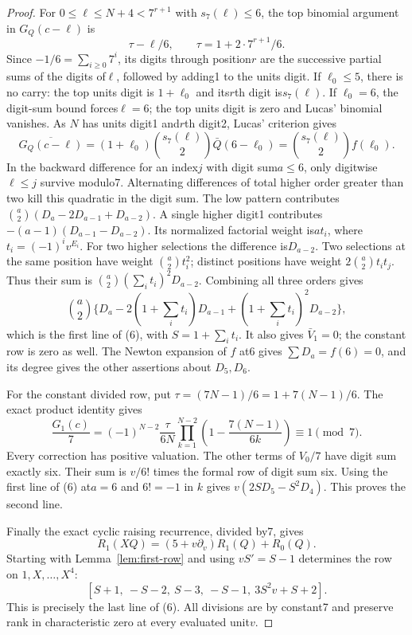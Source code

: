 \documentclass[11pt]{article}
\begin{document}
\begin{proof}
For $0\le\ell\le N+4<7^{r+1}$ with $s_7(\ell)\le6$,
the top binomial argument in $G_Q(c-\ell)$ is
\[
 \tau-\ell/6,\qquad \tau=1+2\cdot7^{r+1}/6.
\]
Since $-1/6=\sum_{i\ge0}7^i$, its digits through position$r$
are the successive partial sums of the digits of$\ell$,
followed by adding1 to the units digit.
If $\ell_0\le5$, there is no carry: the top units digit is
$1+\ell_0$ and its$r$th digit is$s_7(\ell)$.
If $\ell_0=6$, the digit-sum bound forces$\ell=6$;
the top units digit is zero and Lucas' binomial vanishes.
As $N$ has units digit1 and$r$th digit2, Lucas' criterion gives
\[
 \overline{G_Q(c-\ell)}
          =(1+\ell_0)\binom{s_7(\ell)}2\bar Q(6-\ell_0)
          =\binom{s_7(\ell)}2f(\ell_0).
\]
In the backward difference for an index$j$ with digit sum$a\le6$,
only digitwise $\ell\le j$ survive modulo7.
Alternating differences of total higher order greater than two
kill this quadratic in the digit sum.
The low pattern contributes
$\binom a2(D_a-2D_{a-1}+D_{a-2})$.
A single higher digit1 contributes
$-(a-1)(D_{a-1}-D_{a-2})$.
Its normalized factorial weight is$a t_i$, where
$t_i=(-1)^iv^{E_i}$.
For two higher selections the difference is$D_{a-2}$.
Two selections at the same position have weight
$\binom a2t_i^2$; distinct positions have weight
$2\binom a2t_it_j$.
Thus their sum is $\binom a2(\sum_i t_i)^2D_{a-2}$.
Combining all three orders gives
\[
 \binom a2\{D_a-2(1+\sum_i t_i)D_{a-1}
                       +(1+\sum_i t_i)^2D_{a-2}\},
\]
which is the first line of (6), with $S=1+\sum_i t_i$.
It also gives $\bar V_1=0$; the constant row is zero as well.
The Newton expansion of $f$ at6 gives $\sum D_a=f(6)=0$,
and its degree gives the other assertions about $D_5,D_6$.

For the constant divided row, put
$\tau=(7N-1)/6=1+7(N-1)/6$.
The exact product identity gives
\[
 \frac{G_1(c)}7=(-1)^{N-2}\frac{\tau}{6N}
       \prod_{k=1}^{N-2}\left(1-\frac{7(N-1)}{6k}\right)
       \equiv1\pmod7 .
\]
Every correction has positive valuation.
The other terms of $V_0/7$ have digit sum exactly six.
Their sum is $v/6!$ times the formal row of digit sum six.
Using the first line of (6) at$a=6$ and $6!=-1$ in $k$
gives $v(2SD_5-S^2D_4)$.
This proves the second line.

Finally the exact cyclic raising recurrence, divided by7, gives
\[
 R_1(XQ)=(5+v\partial_v)R_1(Q)+R_0(Q).
\]
Starting with Lemma~\ref{lem:first-row} and using $vS'=S-1$
determines the row on $1,X,\ldots,X^4$:
\[
 [S+1,\ -S-2,\ S-3,\ -S-1,\ 3S^2v+S+2].
\]
This is precisely the last line of (6).
All divisions are by constant7 and preserve rank in characteristic
zero at every evaluated unit$v$.
\end{proof}
\end{document}
